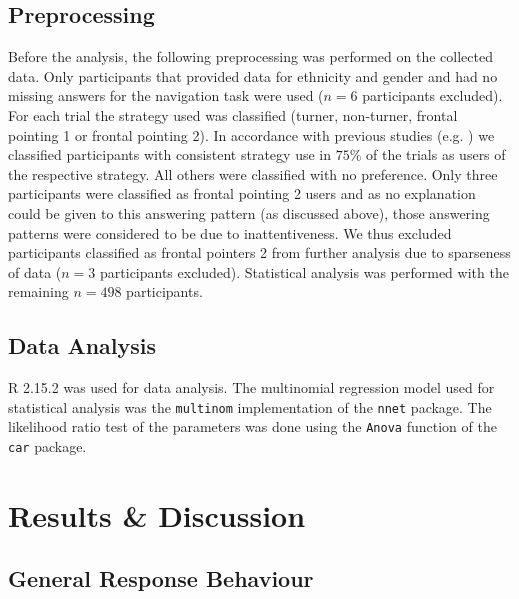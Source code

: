 \documentclass{frontiersSCNS} %
\begin{document}
\subsection{Preprocessing}
Before the analysis, the following preprocessing was performed on the collected data. Only participants that provided data for ethnicity and gender and had no missing answers for the navigation task were used ($n = 6$ participants excluded). For each trial the strategy used was classified (turner, non-turner, frontal pointing 1 or frontal pointing 2). In accordance with previous studies (e.g. \cite{Goeke2013}) we classified participants with consistent strategy use in $75\%$ of the trials as users of the respective strategy. All others were classified with no preference. Only three participants were classified as frontal pointing 2 users and as no explanation could be given to this answering pattern (as discussed above), those answering patterns were considered to be due to inattentiveness. We thus excluded participants classified as frontal pointers 2 from further analysis due to sparseness of data ($n = 3$ participants excluded). Statistical analysis was performed with the remaining $n = 498$ participants.

\subsection{Data Analysis}
R 2.15.2 was used for data analysis. The multinomial regression model used for statistical analysis was the \texttt{multinom} implementation of the \texttt{nnet} package. The likelihood ratio test of the parameters was done using the \texttt{Anova} function of the \texttt{car} package. 





\section{Results \& Discussion}

\subsection{General Response Behaviour}
\end{document}
